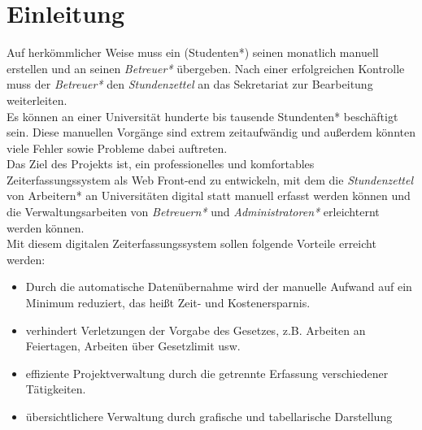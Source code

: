 \section{Einleitung}

Auf herkömmlicher Weise muss ein  (Studenten*) seinen  monatlich manuell erstellen und an seinen \emph{Betreuer*} übergeben. Nach einer erfolgreichen Kontrolle muss der \emph{Betreuer*} den \emph{Stundenzettel} an das Sekretariat zur Bearbeitung weiterleiten. \\

Es können an einer Universität hunderte bis tausende Stundenten* beschäftigt sein. Diese manuellen Vorgänge sind extrem zeitaufwändig und außerdem könnten viele Fehler sowie Probleme dabei auftreten.\\

Das Ziel des Projekts ist, ein professionelles und komfortables Zeiterfassungssystem als Web Front-end zu entwickeln, mit dem die \emph{Stundenzettel} von Arbeitern* an Universitäten digital statt manuell erfasst werden können und die Verwaltungsarbeiten von \emph{Betreuern*} und \emph{Administratoren*} erleichternt werden können.\\

Mit diesem digitalen Zeiterfassungssystem sollen folgende Vorteile erreicht werden:\\

\begin{itemize}
	\item Durch die automatische Datenübernahme wird der manuelle Aufwand auf ein Minimum reduziert, das heißt Zeit- und Kostenersparnis.
	\item verhindert Verletzungen der Vorgabe des Gesetzes, z.B. Arbeiten an Feiertagen, Arbeiten über Gesetzlimit usw.
	\item effiziente Projektverwaltung durch die getrennte Erfassung verschiedener Tätigkeiten.
	\item übersichtlichere Verwaltung durch grafische und tabellarische Darstellung
\end{itemize}
